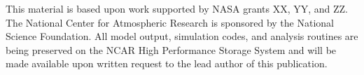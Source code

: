 \documentclass[draft,jgrga]{agutex}
\begin{document}
\begin{article}
%
%
%
%
%
%
%

\begin{acknowledgments}
This material is based upon work supported by NASA grants XX, YY, and ZZ.  The National Center for Atmospheric Research is sponsored by the National Science Foundation.  All model output, simulation codes, and analysis routines are being preserved on the NCAR High Performance Storage System and will be made available upon written request to the lead author of this publication. 
\end{acknowledgments}

%
%
%
%
%
%
%
%
%


\end{article}
\end{document}
